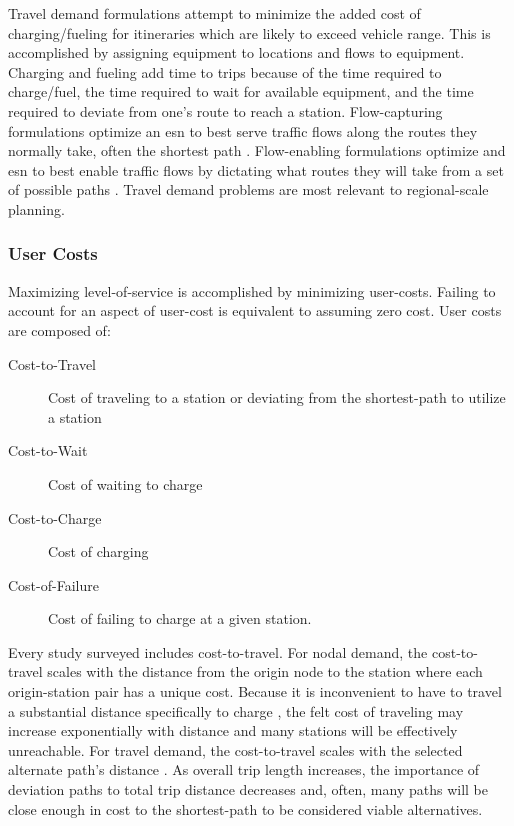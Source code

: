 Travel demand formulations attempt to minimize the added cost of charging/fueling for itineraries which are likely to exceed vehicle range. This is accomplished by assigning equipment to locations and flows to equipment. Charging and fueling add time to trips because of the time required to charge/fuel, the time required to wait for available equipment, and the time required to deviate from one's route to reach a station. Flow-capturing formulations optimize an \gls{esn} to best serve traffic flows along the routes they normally take, often the shortest path \citep{Kuby_2005_seps, Kuby_2007_nse, Upchurch_2009_ga}. Flow-enabling formulations optimize and \gls{esn} to best enable traffic flows by dictating what routes they will take from a set of possible paths \citep{Kim_2012_ijhe, MirHassani_2013_ts, Huang_Li_2015_nse, Li_Huang_2016_trc, Zhang_2017_trb, Tian_2018_s, Arslan_2019_ts, Anjos_2020_ejor, Wu_2024_e, Zeng_2024_mt, Ala_2024_scis, Pourvaziri_2024_tre}. Travel demand problems are most relevant to regional-scale planning.

\subsubsection{User Costs}

Maximizing level-of-service is accomplished by minimizing user-costs. Failing to account for an aspect of user-cost is equivalent to assuming zero cost. User costs are composed of: 

\begin{description}
	\item[Cost-to-Travel] Cost of traveling to a station or deviating from the shortest-path to utilize a station
	\item[Cost-to-Wait] Cost of waiting to charge
	\item[Cost-to-Charge] Cost of charging
	\item[Cost-of-Failure] Cost of failing to charge at a given station.
\end{description}

Every study surveyed includes cost-to-travel. For nodal demand, the cost-to-travel scales with the distance from the origin node to the station \citep{Zhu_2018_jssse, Yi_2019_e, Xiao_2020_jes, Ma_Xie_2021_trd, Kuby_2023_he, Faustino_2023_e, Gupta_2023_jes, Liu_2023_ijst, Weekx_2024_trr, Yuvaraj_2024_ia, Davatgari_2024_ejor, Tungom_2024_esa, Vijay_2024_es, Wu_2024_trd} where each origin-station pair has a unique cost. Because it is inconvenient to have to travel a substantial distance specifically to charge \citep{Rabinowitz_2023_ia}, the felt cost of traveling may increase exponentially with distance and many stations will be effectively unreachable. For travel demand, the cost-to-travel scales with the selected alternate path's distance \citep{Kuby_2005_seps, Kuby_2007_nse, Upchurch_2009_ga, Kim_2012_ijhe, MirHassani_2013_ts, Huang_Li_2015_nse, Li_Huang_2016_trc, Zhang_2017_trb, Tian_2018_s, Arslan_2019_ts, Anjos_2020_ejor, Wu_2024_trd, Zeng_2024_mt, Ala_2024_scis, Pourvaziri_2024_tre}. As overall trip length increases, the importance of deviation paths to total trip distance decreases and, often, many paths will be close enough in cost to the shortest-path to be considered viable alternatives.

